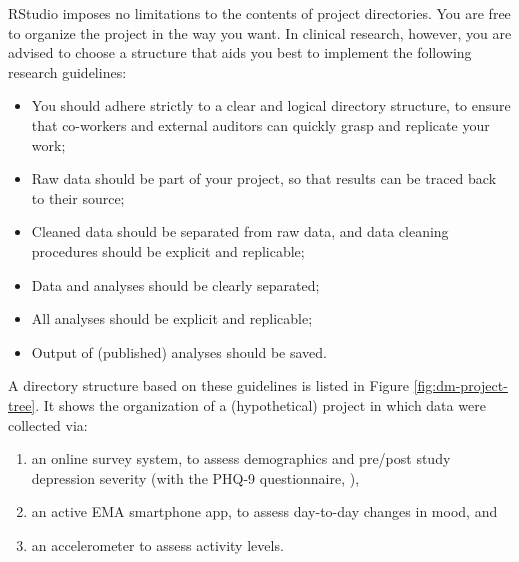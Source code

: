\documentclass[]{book}
\begin{document}

RStudio imposes no limitations to the contents of project directories.
You are free to organize the project in the way you want. In clinical
research, however, you are advised to choose a structure that aids you
best to implement the following research guidelines:

\begin{itemize}
\item
  You should adhere strictly to a clear and logical directory structure,
  to ensure that co-workers and external auditors can quickly grasp and
  replicate your work;
\item
  Raw data should be part of your project, so that results can be traced
  back to their source;
\item
  Cleaned data should be separated from raw data, and data cleaning
  procedures should be explicit and replicable;
\item
  Data and analyses should be clearly separated;
\item
  All analyses should be explicit and replicable;
\item
  Output of (published) analyses should be saved.
\end{itemize}

A directory structure based on these guidelines is listed in Figure
\ref{fig:dm-project-tree}. It shows the organization of a (hypothetical)
project in which data were collected via:

\begin{enumerate}
\def\labelenumi{\arabic{enumi}.}
\item
  an online survey system, to assess demographics and pre/post study
  depression severity (with the PHQ-9 questionnaire,
  \citet{Kroenke2009}),
\item
  an active EMA smartphone app, to assess day-to-day changes in mood,
  and
\item
  an accelerometer to assess activity levels.
\end{enumerate}
\end{document}

